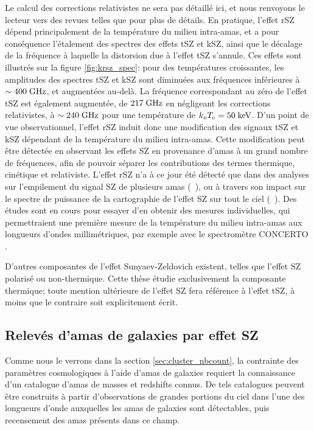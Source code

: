 Le calcul des corrections relativistes ne sera pas détaillé ici, et nous renvoyons le lecteur vers des revues telles que \cite{mroczkowski_astrophysics_2019} pour plus de détails.
En pratique, l'effet rSZ dépend principalement de la température du milieu intra-amas, et a pour conséquence l'étalement des spectres des effets tSZ et kSZ, ainsi que le décalage de la fréquence à laquelle la distorsion due à l'effet tSZ s'annule.
Ces effets sont illustrés sur la figure \ref{fig:krsz_spec}: pour des températures croissantes, les amplitudes des spectres tSZ et kSZ sont diminuées aux fréquences inférieures à $\sim 400 \;{\rm GHz}$, et augmentées au-delà.
La fréquence correspondant au zéro de l'effet tSZ est également augmentée, de $217 \;{\rm GHz}$ en négligeant les corrections relativistes, à $\sim 240 \;{\rm GHz}$ pour une température de $k_\textsc{b} T_{\rm e} = 50 \;{\rm keV}$.
D'un point de vue observationnel, l'effet rSZ induit donc une modification des signaux tSZ et kSZ dépendant de la température du milieu intra-amas.
Cette modification peut être détectée en observant les effets SZ en provenance d'amas à un grand nombre de fréquences, afin de pouvoir séparer les contributions des termes thermique, cinétique et relativiste.
L'effet rSZ n'a à ce jour été détecté que dans des analyses sur l'empilement du signal SZ de plusieurs amas (\eg\ \cite{hurier_high_2016}), ou à travers son impact sur le spectre de puissance de la cartographie de l'effet SZ sur tout le ciel (\eg\ \cite{remazeilles_can_2019}).
Des études sont en cours pour essayer d'en obtenir des mesures individuelles, qui permettraient une première mesure de la température du milieu intra-amas aux longueurs d'ondes millimétriques, par exemple avec le spectromètre CONCERTO \cite{the_concerto_collaboration_wide_2020}.

D'autres composantes de l'effet Sunyaev-Zeldovich existent, telles que l'effet SZ polarisé ou non-thermique.
Cette thèse étudie exclusivement la composante thermique; toute mention ultérieure de l'effet SZ fera référence à l'effet tSZ, à moins que le contraire soit explicitement écrit.

\subsection{Relevés d'amas de galaxies par effet SZ}

Comme nous le verrons dans la section \ref{sec:cluster_nbcount}, la contrainte des paramètres cosmologiques à l'aide d'amas de galaxies requiert la connaissance d'un catalogue d'amas de masses et redshifts connus.
De tels catalogues peuvent être construits à partir d'observations de grandes portions du ciel dans l'une des longueurs d'onde auxquelles les amas de galaxies sont détectables, puis recensement des amas présents dans ce champ.

